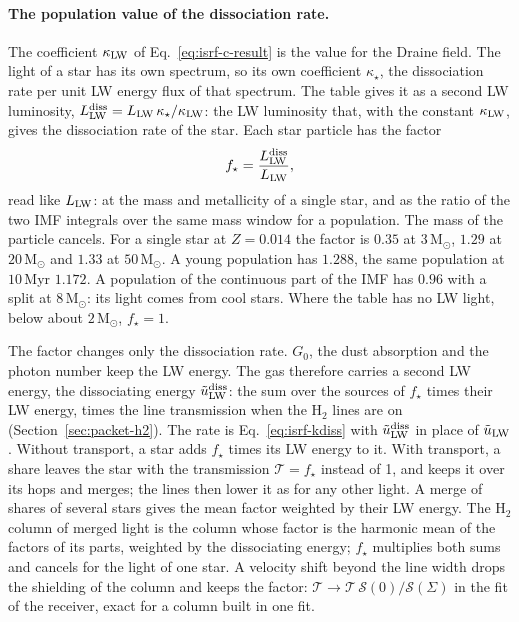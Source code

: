 \paragraph{The population value of the dissociation rate.}
\label{sec:isrf-lw-population}
The coefficient $\kappa_{\rm LW}$ of Eq.~\eqref{eq:isrf-c-result} is the value
for the Draine field. The light of a star has its own spectrum, so its own
coefficient $\kappa_\star$, the dissociation rate per unit LW energy flux of
that spectrum. The table gives it as a second LW luminosity,
$L_{\rm LW}^{\rm diss}=L_{\rm LW}\,\kappa_\star/\kappa_{\rm LW}$: the LW
luminosity that, with the constant $\kappa_{\rm LW}$, gives the dissociation
rate of the star. Each star particle has the factor
\begin{equation}
  f_\star=\frac{L_{\rm LW}^{\rm diss}}{L_{\rm LW}} ,
  \label{eq:isrf-lw-population}
\end{equation}
read like $L_{\rm LW}$: at the mass and metallicity of a single star, and as
the ratio of the two IMF integrals over the same mass window for a population.
The mass of the particle cancels. For a single star at $Z=0.014$ the factor
is $0.35$ at $3$\,M$_\odot$, $1.29$ at $20$\,M$_\odot$ and $1.33$ at
$50$\,M$_\odot$. A young population has $1.288$, the same population at
$10$\,Myr $1.172$. A population of the continuous part of the IMF has $0.96$
with a split at $8$\,M$_\odot$: its light comes from cool stars. Where the
table has no LW light, below about $2$\,M$_\odot$, $f_\star=1$.

The factor changes only the dissociation rate. $G_0$, the dust absorption
and the photon number keep the LW energy. The gas therefore carries a second
LW energy, the dissociating energy $\tilde u_{\rm LW}^{\rm diss}$: the sum over
the sources of $f_\star$ times their LW energy, times the line transmission
when the H$_2$ lines are on (Section~\ref{sec:packet-h2}). The rate is
Eq.~\eqref{eq:isrf-kdiss} with $\tilde u_{\rm LW}^{\rm diss}$ in place of
$\tilde u_{\rm LW}$. Without transport, a star adds $f_\star$ times its LW
energy to it. With transport, a share leaves the star with the transmission
$\mathcal T=f_\star$ instead of 1, and keeps it over its hops and merges; the
lines then lower it as for any other light. A merge of shares of several
stars gives the mean factor weighted by their LW energy. The H$_2$ column of
merged light is the column whose factor is the harmonic mean of the factors
of its parts, weighted by the dissociating energy; $f_\star$ multiplies both
sums and cancels for the light of one star. A velocity shift beyond the line
width drops the shielding of the column and keeps the factor:
$\mathcal T\to\mathcal T\,\mathcal S(0)/\mathcal S(\Sigma)$ in the fit of the
receiver, exact for a column built in one fit.

